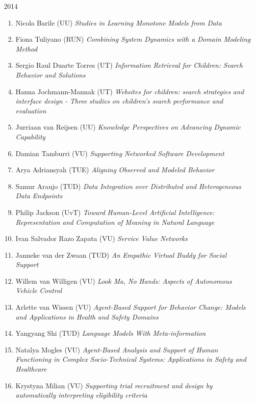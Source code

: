 \begin{multicols}{2}
\begin{scriptsize}
\vspace{0.2cm}
2014
\vspace{0.2cm}
\begin{enumerate}[leftmargin=*,noitemsep,topsep=0pt,parsep=1pt,partopsep=0pt]
\renewcommand{\labelenumi}{2014-\arabic{enumi}}
\item Nicola Barile (UU) \textit{Studies in Learning Monotone Models from Data
}\item Fiona Tuliyano (RUN) \textit{Combining System Dynamics with a Domain Modeling Method
}\item Sergio Raul Duarte Torres (UT) \textit{Information Retrieval for Children: Search Behavior and Solutions
}\item Hanna Jochmann-Mannak (UT) \textit{Websites for children: search strategies and interface design - Three studies on children's search performance and evaluation
}\item Jurriaan van Reijsen (UU) \textit{Knowledge Perspectives on Advancing Dynamic Capability
}\item Damian Tamburri (VU) \textit{Supporting Networked Software Development 
}\item Arya Adriansyah (TUE) \textit{Aligning Observed and Modeled Behavior
}\item Samur Araujo (TUD) \textit{Data Integration over Distributed and Heterogeneous Data Endpoints
}\item Philip Jackson (UvT) \textit{Toward Human-Level Artificial Intelligence: Representation and Computation of Meaning in Natural Language
}\item Ivan Salvador Razo Zapata (VU) \textit{Service Value Networks
}\item Janneke van der Zwaan (TUD) \textit{An Empathic Virtual Buddy for Social Support
}\item Willem van Willigen (VU) \textit{Look Ma, No Hands: Aspects of Autonomous Vehicle Control
}\item Arlette van Wissen (VU) \textit{Agent-Based Support for Behavior Change: Models and Applications in Health and Safety Domains
}\item Yangyang Shi (TUD) \textit{Language Models With Meta-information
}\item Natalya Mogles (VU) \textit{Agent-Based Analysis and Support of Human Functioning in Complex Socio-Technical Systems: Applications in Safety and Healthcare
}\item Krystyna Milian (VU) \textit{Supporting trial recruitment and design by automatically interpreting eligibility criteria
}
\end{enumerate}
\end{scriptsize}
\end{multicols}
